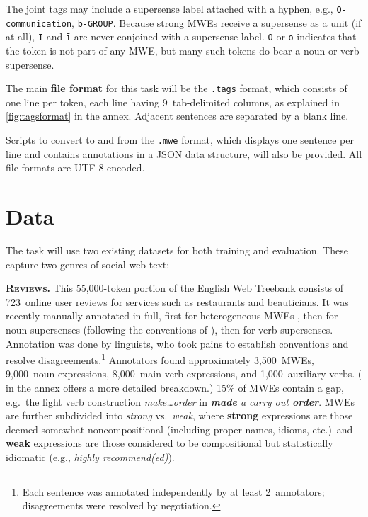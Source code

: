 \documentclass[11pt]{article}
\newcommand{\lex}[1]{\textit{#1}} %
\newcommand{\longversion}[1]{} %
\begin{document}
The joint tags may include a supersense label attached with a hyphen, 
e.g., \texttt{O-communication}, \texttt{b-GROUP}.
Because strong MWEs receive a supersense as a unit (if at all), 
\texttt{Ī} and \texttt{ī} are never conjoined with a supersense label.
\texttt{O} or \texttt{o} indicates that the token is not part of any MWE, 
but many such tokens do bear a noun or verb supersense.
\longversion{Of course, the supersenses in this task only cover noun and verb expressions, 
so plain \texttt{O} will be frequent, as will plain \texttt{B} and \texttt{Ī} for (e.g.) PP idioms.}

The main \textbf{file format} for this task will be the \texttt{.tags} format, 
which consists of one line per token, each line having 9~tab-delimited columns, 
as explained in \cref{fig:tagsformat} in the annex.
Adjacent sentences are separated by a blank line.

Scripts to convert to and from the \texttt{.mwe} format, which displays one sentence per line 
and contains annotations in a JSON data structure, will also be provided.
All file formats are UTF-8 encoded.

\section{Data}\label{sec:data}

The task will use two existing datasets for both training and evaluation. 
These capture two genres of social web text:

\textbf{\textsc{Reviews}.} This 55,000-token portion of the English Web Treebank \citep[EWTB;][]{ewtb} 
consists of 723~online user reviews for services such as restaurants and beauticians.\longversion{\footnote{Each review is a separate document; 
no metadata about the reviews is available. EWTB provides sentence segmentation, word tokenization, and a Penn Treebank--style 
syntactic parse of each sentence.}}
It was recently manually annotated in full, first for heterogeneous MWEs \citep[released as the CMWE Corpus\footnote{\url{http://www.ark.cs.cmu.edu/LexSem/}}]{schneider-14-corpus}, 
then for noun supersenses (following the conventions of \citealp{schneider-12}), then for verb supersenses. 
Annotation was done by linguists, who took pains to establish conventions and resolve disagreements.\footnote{Each 
sentence was annotated independently by at least 2~annotators; disagreements were resolved by negotiation.} 
Annotators found approximately 3,500~MWEs, 9,000~noun expressions, 8,000~main verb expressions, and 1,000~auxiliary verbs. 
( in the annex offers a more detailed breakdown.)
15\% of MWEs contain a gap, e.g.~the light verb construction \lex{make\ldots order} in
\emph{\textbf{made} a carry out \textbf{order}}.
MWEs are further subdivided into \emph{strong} vs.~\emph{weak}, 
where \textbf{strong} expressions are those deemed somewhat noncompositional (including proper names, idioms, etc.)~and 
\textbf{weak} expressions are those considered to be compositional but statistically idiomatic (e.g., \lex{highly recommend(ed)}).
\end{document}
